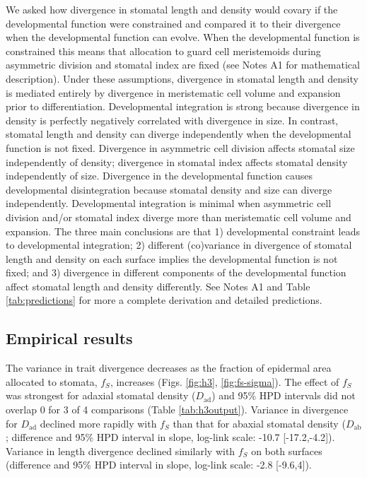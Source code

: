 \documentclass[
  12pt,
]{article}
\begin{document}
We asked how divergence in stomatal length and density would covary if the developmental function were constrained and compared it to their divergence when the developmental function can evolve. When the developmental function is constrained this means that allocation to guard cell meristemoids during asymmetric division and stomatal index are fixed (see Notes A1 for mathematical description). Under these assumptions, divergence in stomatal length and density is mediated entirely by divergence in meristematic cell volume and expansion prior to differentiation. Developmental integration is strong because divergence in density is perfectly negatively correlated with divergence in size. In contrast, stomatal length and density can diverge independently when the developmental function is not fixed. Divergence in asymmetric cell division affects stomatal size independently of density; divergence in stomatal index affects stomatal density independently of size. Divergence in the developmental function causes developmental disintegration because stomatal density and size can diverge independently. Developmental integration is minimal when asymmetric cell division and/or stomatal index diverge more than meristematic cell volume and expansion. The three main conclusions are that 1) developmental constraint leads to developmental integration; 2) different (co)variance in divergence of stomatal length and density on each surface implies the developmental function is not fixed; and 3) divergence in different components of the developmental function affect stomatal length and density differently. See Notes A1 and Table \ref{tab:predictions} for more a complete derivation and detailed predictions.

\hypertarget{empirical-results}{%
\subsection{Empirical results}\label{empirical-results}}

The variance in trait divergence decreases as the fraction of epidermal area allocated to stomata, \(f_S\), increases (Figs. \ref{fig:h3}, \ref{fig:fs-sigma}). The effect of \(f_S\) was strongest for adaxial stomatal density (\(D_\text{ad}\)) and 95\% HPD intervals did not overlap 0 for 3 of 4 comparisons (Table \ref{tab:h3output}). Variance in divergence for \(D_\text{ad}\) declined more rapidly with \(f_S\) than that for abaxial stomatal density (\(D_\text{ab}\); difference and 95\% HPD interval in slope, log-link scale: -10.7 {[}-17.2,-4.2{]}). Variance in length divergence declined similarly with \(f_S\) on both surfaces (difference and 95\% HPD interval in slope, log-link scale: -2.8 {[}-9.6,4{]}).
\end{document}
